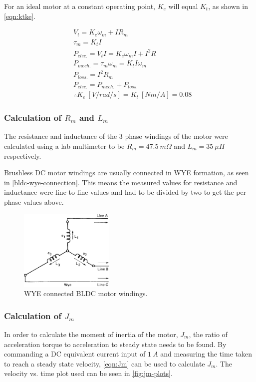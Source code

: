 For an ideal motor at a constant operating point, $K_e$ will equal $K_t$, as shown in \cref{eqn:ktke}.

\begin{equation} \label{eqn:ktke}
\begin{aligned}
&V_t = K_e\omega_m + IR_m \\
&\tau_m = K_t I \\
&P_{elec.} = V_t I = K_e \omega_m I + I^2 R \\ 
&P_{mech.} = \tau_m \omega_m = K_t I \omega_m \\
&P_{loss.} = I^2 R_m \\
&P_{elec.} = P_{mech.} + P_{loss.} \\
&\therefore K_e\ [V/rad/s]= K_t\ [Nm/A] = 0.08
\end{aligned} 
\end{equation}

\subsubsection{Calculation of $R_m$ and $L_m$}
The resistance and inductance of the 3 phase windings of the motor were calculated using a lab multimeter to be $R_m = 47.5\ m\Omega$ and $L_m = 35\ \mu H$ respectively. 

Brushless DC motor windings are usually connected in WYE formation, as seen in \cref{bldc-wye-connection}. This means the measured values for resistance and inductance were line-to-line values and had to be divided by two to get the per phase values above.

\begin{figure}
\centering
\includegraphics[width=0.4\textwidth]{images/motor/wye.jpg} 
\caption{WYE connected BLDC motor windings.}
\label{fig:bldc-wye-connection}
\end{figure}

\subsubsection{Calculation of $J_m$}
In order to calculate the moment of inertia of the motor, $J_m$, the ratio of acceleration torque to acceleration to steady state needs to be found. By commanding a DC equivalent current input of $1\ A$ and measuring the time taken to reach a steady state velocity, \cref{eqn:Jm} can be used to calculate $J_m$. The velocity vs. time plot used can be seen in \cref{fig:jm-plots}.

